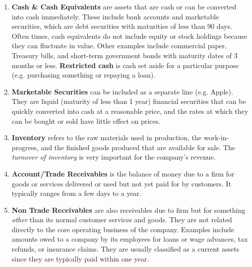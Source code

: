 \documentclass{article}
\begin{document}
    \begin{definition}
      \begin{enumerate}
        \item \textbf{Cash \& Cash Equivalents} are assets that are cash or can be converted into cash immediately. These include bank accounts and marketable securities, which are debt securities with maturities of less than 90 days. Often times, cash equivalents do not include equity or stock holdings because they can fluctuate in value. Other examples include commercial paper, Treasury bills, and short-term government bonds with maturity dates of 3 months or less. \textbf{Restricted cash} is cash set aside for a particular purpose (e.g. purchasing something or repaying a loan).
        \item \textbf{Marketable Securities} can be included as a separate line (e.g. Apple). They are liquid (maturity of less than 1 year) financial securities that can be quickly converted into cash at a reasonable price, and the rates at which they can be bought or sold have little effect on prices.
        \item \textbf{Inventory} refers to the raw materials used in production, the work-in-progress, and the finished goods produced that are available for sale. The \textit{turnover of inventory} is very important for the company's revenue.
        \item \textbf{Account/Trade Receivables} is the balance of money due to a firm for goods or services delivered or used but not yet paid for by customers. It typically ranges from a few days to a year.
        \item \textbf{Non Trade Receivables} are also receivables due to firm but for something \textit{other} than its normal customer services and goods. They are not related directly to the core operating business of the company. Examples include amounts owed to a company by its employees for loans or wage advances, tax refunds, or insurance claims. They are usually classified as a current assets since they are typically paid within one year.


\end{enumerate}
\end{definition}
\end{document}
